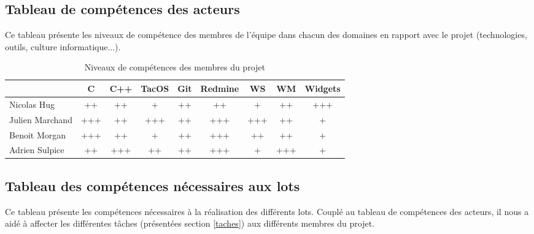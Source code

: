 \subsection{Tableau de compétences des acteurs}

Ce tableau présente les niveaux de compétence des membres de l'équipe dans chacun des domaines en rapport avec le projet (technologies, outils, culture informatique...).

\begin{table}[h]
\centering
\begin{tabular}{|l|c|c|c|c|c|c|c|c|}
  \rowcolor{dark_grey} \hline &  C \footnotemark[1] & C++ \footnotemark[2] & TacOS & Git & Redmine & WS \footnotemark[3] & WM \footnotemark[4] & Widgets \footnotemark[5] \\
  \hline
  Nicolas Hug       &   ++    &   ++    &   +   &   ++    &   ++    &   +     &   ++    &   +++ \\
  \hline
  Julien Marchand   &   +++   &   ++    &  +++  &   ++    &   +++   &   +++   &   ++    &   + \\
  \hline
  Benoit Morgan     &   +++   &   ++    &   +   &   ++    &   +++   &   ++    &   ++    &   + \\
  \hline
  Adrien Sulpice    &   ++    &   +++   &   ++  &   ++    &   +++   &   +     &   +++   &   + \\
  \hline
\end{tabular}
\caption{Niveaux de compétences des membres du projet}
\end{table}


\subsection{Tableau des compétences nécessaires aux lots}

Ce tableau présente les compétences nécessaires à la réalisation des différents lots. Couplé au tableau de compétences des acteurs, il nous a aidé à affecter les différentes tâches (présentées section \ref{taches}) aux différents membres du projet.

